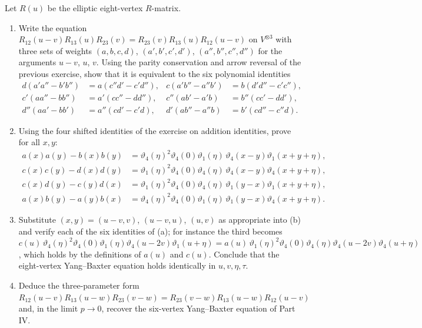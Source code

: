 \begin{exercise}
Let $R(u)$ be the elliptic eight-vertex $R$-matrix.
\begin{enumerate}[label=(\alph*)]
\item Write the equation
$R_{12}(u-v)R_{13}(u)R_{23}(v)=R_{23}(v)R_{13}(u)R_{12}(u-v)$ on
$V^{\otimes3}$ with three sets of weights $(a,b,c,d)$, $(a',b',c',d')$,
$(a'',b'',c'',d'')$ for the arguments $u-v$, $u$, $v$.  Using the
parity conservation and arrow reversal of the previous exercise, show that
it is equivalent to the six polynomial identities
\begin{align*}
 d(a'a''-b'b'')&=a(c''d'-c'd''),&
 c(a'b''-a''b')&=b(d'd''-c'c''),\\
 c'(aa''-bb'')&=a'(cc''-dd''),&
 c''(ab'-a'b)&=b''(cc'-dd'),\\
 d''(aa'-bb')&=a''(cd'-c'd),&
 d'(ab''-a''b)&=b'(cd''-c''d).
\end{align*}
\item Using the four shifted identities of the exercise on addition
identities, prove for all $x,y$:
\begin{align*}
 a(x)a(y)-b(x)b(y)&=\vartheta_4(\eta)^2\vartheta_4(0)\vartheta_1(\eta)\,\vartheta_4(x-y)\vartheta_1(x+y+\eta),\\
 c(x)c(y)-d(x)d(y)&=\vartheta_1(\eta)^2\vartheta_4(0)\vartheta_4(\eta)\,\vartheta_4(x-y)\vartheta_4(x+y+\eta),\\
 c(x)d(y)-c(y)d(x)&=\vartheta_1(\eta)^2\vartheta_4(0)\vartheta_4(\eta)\,\vartheta_1(y-x)\vartheta_1(x+y+\eta),\\
 a(x)b(y)-a(y)b(x)&=\vartheta_4(\eta)^2\vartheta_4(0)\vartheta_1(\eta)\,\vartheta_1(y-x)\vartheta_4(x+y+\eta).
\end{align*}
\item Substitute $(x,y)=(u-v,v)$, $(u-v,u)$, $(u,v)$ as appropriate into
(b) and verify each of the six identities of (a); for instance the third
becomes
$c(u)\,\vartheta_4(\eta)^2\vartheta_4(0)\vartheta_1(\eta)\vartheta_4(u-2v)\vartheta_1(u+\eta)
=a(u)\,\vartheta_1(\eta)^2\vartheta_4(0)\vartheta_4(\eta)\vartheta_4(u-2v)\vartheta_4(u+\eta)$,
which holds by the definitions of $a(u)$ and $c(u)$.  Conclude that the
eight-vertex Yang--Baxter equation holds identically in $u,v,\eta,\tau$.
\item Deduce the three-parameter form
$R_{12}(u-v)R_{13}(u-w)R_{23}(v-w)=R_{23}(v-w)R_{13}(u-w)R_{12}(u-v)$
and, in the limit $p\to0$, recover the six-vertex Yang--Baxter equation
of Part IV.
\end{enumerate}
\end{exercise}

